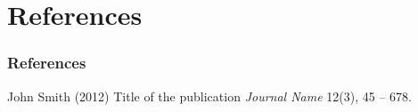 \section{References}

\begin{frame}
    \frametitle{References}
    \footnotesize{
    \begin{thebibliography}{99} %
     John Smith (2012)
    \newblock Title of the publication
    \newblock \emph{Journal Name} 12(3), 45 -- 678.
    \end{thebibliography}
    }
\end{frame}